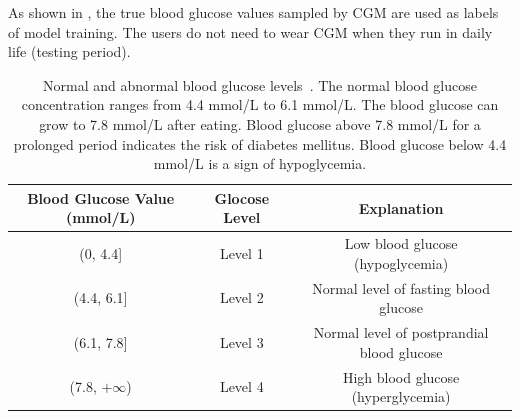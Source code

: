 As shown in , the true blood glucose values sampled by CGM are used as labels of model training. The users do not need to wear CGM when they run \sysname in daily life (\ie testing period).


\begin{table}[h]
  \centering
  \caption{Normal and abnormal blood glucose levels~\cite{bib:BGWiKi}. The normal blood glucose concentration ranges from 4.4 mmol/L to 6.1 mmol/L. The blood glucose can grow to 7.8 mmol/L after eating. Blood glucose above 7.8 mmol/L for a prolonged period indicates the risk of diabetes mellitus. Blood glucose below 4.4 mmol/L is a sign of hypoglycemia.}
  \label{tab:blood_glucose_levels}
  \begin{tabular}{|c|c|c|}
  \hline
  \textbf{Blood Glucose Value (mmol/L)} & \textbf{Glocose Level} & \textbf{Explanation}                      \\ \hline
  (0, 4.4{]}                            & Level 1                & Low blood glucose (hypoglycemia)         \\ \hline
  (4.4, 6.1{]}                          & Level 2                & Normal level of fasting blood glucose      \\ \hline
  (6.1, 7.8{]}                          & Level 3                & Normal level of postprandial blood glucose \\ \hline
  (7.8, $+\infty$)                      & Level 4                & High blood glucose (hyperglycemia)          \\ \hline
  \end{tabular}
\end{table}




